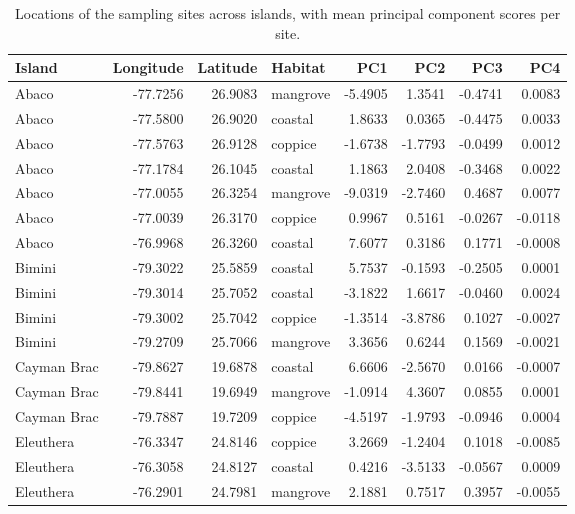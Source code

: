 

\begin{table}[H]
    \caption{Locations of the sampling sites across islands, with mean principal component scores per site.}
    \centering
    \begin{tabular}{lrrlrrrr}
        \hline
        Island & Longitude & Latitude & Habitat & PC1 & PC2 & PC3 & PC4\\
        \hline
        Abaco & -77.7256 & 26.9083 & mangrove & -5.4905 & 1.3541 & -0.4741 & 0.0083\\
        Abaco & -77.5800 & 26.9020 & coastal & 1.8633 & 0.0365 & -0.4475 & 0.0033\\
        Abaco & -77.5763 & 26.9128 & coppice & -1.6738 & -1.7793 & -0.0499 & 0.0012\\
        Abaco & -77.1784 & 26.1045 & coastal & 1.1863 & 2.0408 & -0.3468 & 0.0022\\
        Abaco & -77.0055 & 26.3254 & mangrove & -9.0319 & -2.7460 & 0.4687 & 0.0077\\
        Abaco & -77.0039 & 26.3170 & coppice & 0.9967 & 0.5161 & -0.0267 & -0.0118\\
        Abaco & -76.9968 & 26.3260 & coastal & 7.6077 & 0.3186 & 0.1771 & -0.0008\\
        Bimini & -79.3022 & 25.5859 & coastal & 5.7537 & -0.1593 & -0.2505 & 0.0001\\
        Bimini & -79.3014 & 25.7052 & coastal & -3.1822 & 1.6617 & -0.0460 & 0.0024\\
        Bimini & -79.3002 & 25.7042 & coppice & -1.3514 & -3.8786 & 0.1027 & -0.0027\\
        Bimini & -79.2709 & 25.7066 & mangrove & 3.3656 & 0.6244 & 0.1569 & -0.0021\\
        Cayman Brac & -79.8627 & 19.6878 & coastal & 6.6606 & -2.5670 & 0.0166 & -0.0007\\
        Cayman Brac & -79.8441 & 19.6949 & mangrove & -1.0914 & 4.3607 & 0.0855 & 0.0001\\
        Cayman Brac & -79.7887 & 19.7209 & coppice & -4.5197 & -1.9793 & -0.0946 & 0.0004\\
        Eleuthera & -76.3347 & 24.8146 & coppice & 3.2669 & -1.2404 & 0.1018 & -0.0085\\
        Eleuthera & -76.3058 & 24.8127 & coastal & 0.4216 & -3.5133 & -0.0567 & 0.0009\\
        Eleuthera & -76.2901 & 24.7981 & mangrove & 2.1881 & 0.7517 & 0.3957 & -0.0055\\

\end{tabular}
\end{table}

